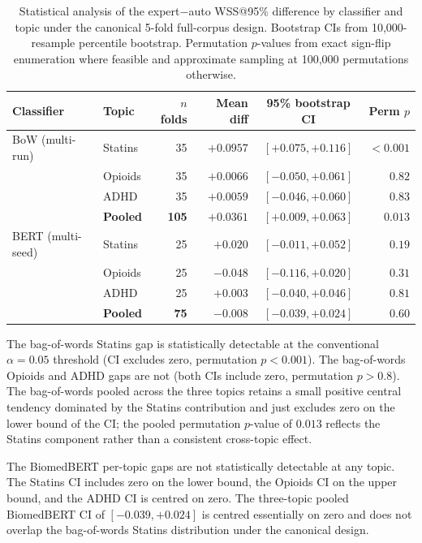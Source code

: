 \documentclass{article}
\begin{document}
\begin{table}[t]
\centering
\small
\begin{tabular}{llrrcr}
\toprule
Classifier & Topic & $n$ folds & Mean diff & 95\% bootstrap CI & Perm $p$ \\
\midrule
BoW (multi-run)  & Statins         & 35  & $+0.0957$ & $[+0.075, +0.116]$ & $< 0.001$ \\
                 & Opioids         & 35  & $+0.0066$ & $[-0.050, +0.061]$ & $0.82$ \\
                 & ADHD            & 35  & $+0.0059$ & $[-0.046, +0.060]$ & $0.83$ \\
                 & \textbf{Pooled} & \textbf{105} & \textbf{$+0.0361$} & \textbf{$[+0.009, +0.063]$} & \textbf{$0.013$} \\
\midrule
BERT (multi-seed) & Statins        & 25  & $+0.020$  & $[-0.011, +0.052]$ & $0.19$ \\
                 & Opioids         & 25  & $-0.048$  & $[-0.116, +0.020]$ & $0.31$ \\
                 & ADHD            & 25  & $+0.003$  & $[-0.040, +0.046]$ & $0.81$ \\
                 & \textbf{Pooled} & \textbf{75} & \textbf{$-0.008$} & \textbf{$[-0.039, +0.024]$} & \textbf{$0.60$} \\
\bottomrule
\end{tabular}
\caption{Statistical analysis of the expert$-$auto WSS@95\% difference by classifier and topic under the canonical 5-fold full-corpus design. Bootstrap CIs from 10,000-resample percentile bootstrap. Permutation $p$-values from exact sign-flip enumeration where feasible and approximate sampling at 100,000 permutations otherwise.}
\label{tab:stats}
\end{table}

The bag-of-words Statins gap is statistically detectable at the conventional $\alpha = 0.05$ threshold (CI excludes zero, permutation $p < 0.001$). The bag-of-words Opioids and ADHD gaps are not (both CIs include zero, permutation $p > 0.8$). The bag-of-words pooled across the three topics retains a small positive central tendency dominated by the Statins contribution and just excludes zero on the lower bound of the CI; the pooled permutation $p$-value of $0.013$ reflects the Statins component rather than a consistent cross-topic effect.

The BiomedBERT per-topic gaps are not statistically detectable at any topic. The Statins CI includes zero on the lower bound, the Opioids CI on the upper bound, and the ADHD CI is centred on zero. The three-topic pooled BiomedBERT CI of $[-0.039, +0.024]$ is centred essentially on zero and does not overlap the bag-of-words Statins distribution under the canonical design.
\end{document}

